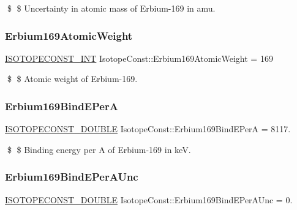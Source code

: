\$ \$ Uncertainty in atomic mass of Erbium-\/169 in amu. \mbox{\label{group___isotope_const-_erbium-_er169_gaf9b945375754ca2049227f93ab59fc8b}} 
\subsubsection{\texorpdfstring{Erbium169\+Atomic\+Weight}{Erbium169AtomicWeight}}
{\footnotesize\ttfamily \mbox{\hyperlink{group___isotope_const-_macros_ga5f18360b3e99483a35c32d789e62621c}{I\+S\+O\+T\+O\+P\+E\+C\+O\+N\+S\+T\+\_\+\+I\+NT}} Isotope\+Const\+::\+Erbium169\+Atomic\+Weight = 169}

\$ \$ Atomic weight of Erbium-\/169. \mbox{\label{group___isotope_const-_erbium-_er169_ga90d0386e969706b233848461a6b83a06}} 
\subsubsection{\texorpdfstring{Erbium169\+Bind\+E\+PerA}{Erbium169BindEPerA}}
{\footnotesize\ttfamily \mbox{\hyperlink{group___isotope_const-_macros_ga8f45a7272ce02c0b4c65c44636ed719a}{I\+S\+O\+T\+O\+P\+E\+C\+O\+N\+S\+T\+\_\+\+D\+O\+U\+B\+LE}} Isotope\+Const\+::\+Erbium169\+Bind\+E\+PerA = 8117.}

\$ \$ Binding energy per A of Erbium-\/169 in keV. \mbox{\label{group___isotope_const-_erbium-_er169_ga395a73afd4d566a8de22e4d010439826}} 
\subsubsection{\texorpdfstring{Erbium169\+Bind\+E\+Per\+A\+Unc}{Erbium169BindEPerAUnc}}
{\footnotesize\ttfamily \mbox{\hyperlink{group___isotope_const-_macros_ga8f45a7272ce02c0b4c65c44636ed719a}{I\+S\+O\+T\+O\+P\+E\+C\+O\+N\+S\+T\+\_\+\+D\+O\+U\+B\+LE}} Isotope\+Const\+::\+Erbium169\+Bind\+E\+Per\+A\+Unc = 0.}

